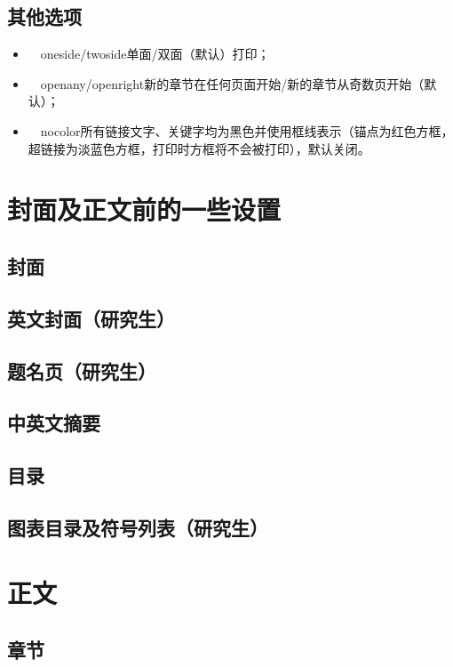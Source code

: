         \subsection{其他选项}
        \begin{itemize}
            \item ~~oneside\slash twoside\quad 单面\slash 双面（默认）打印；\\
            \item ~~openany\slash openright\quad 新的章节在任何页面开始\slash 新的章节从奇数页开始（默认）；\\
            \item ~~nocolor\quad 所有链接文字、关键字均为黑色并使用框线表示（锚点为红色方框，超链接为淡蓝色方框，打印时方框将不会被打印），默认关闭。\\
        \end{itemize}
    \section{封面及正文前的一些设置}
        \subsection{封面}
        \subsection{英文封面（研究生）}
        \subsection{题名页（研究生）}
        \subsection{中英文摘要}
        \subsection{目录}
        \subsection{图表目录及符号列表（研究生）}
    \section{正文}
        \subsection{章节}
